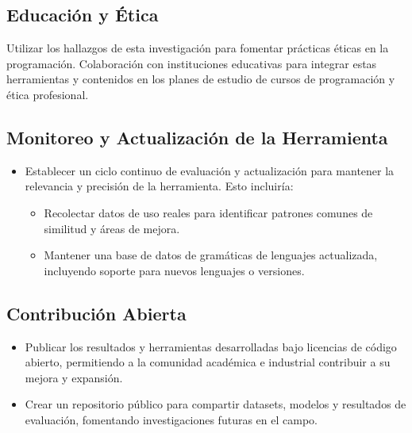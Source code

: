 \begin{recomendations}
\subsection*{Educación y Ética}

 Utilizar los hallazgos de esta investigación para fomentar prácticas éticas en la programación. Colaboración con instituciones educativas para integrar estas herramientas y contenidos en los planes de estudio de cursos de programación y ética profesional.

\subsection*{Monitoreo y Actualización de la Herramienta}
\begin{itemize}
    \item Establecer un ciclo continuo de evaluación y actualización para mantener la relevancia y precisión de la herramienta. Esto incluiría:
    \begin{itemize}
        \item Recolectar datos de uso reales para identificar patrones comunes de similitud y áreas de mejora.
        \item Mantener una base de datos de gramáticas de lenguajes actualizada, incluyendo soporte para nuevos lenguajes o versiones.
    \end{itemize}
\end{itemize}

\subsection*{Contribución Abierta}
\begin{itemize}
    \item Publicar los resultados y herramientas desarrolladas bajo licencias de código abierto, permitiendo a la comunidad académica e industrial contribuir a su mejora y expansión.
    \item Crear un repositorio público para compartir datasets, modelos y resultados de evaluación, fomentando investigaciones futuras en el campo.
\end{itemize}

\end{recomendations}
